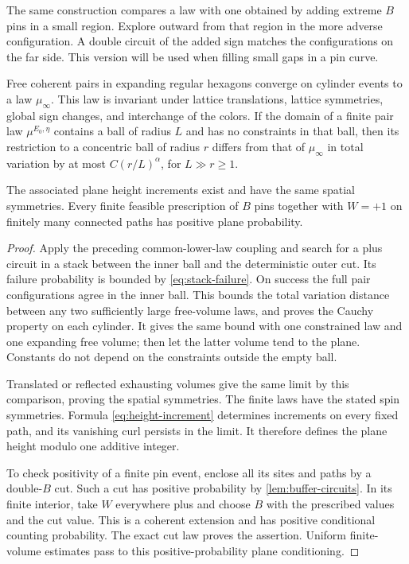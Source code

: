 The same construction compares a law with one obtained by adding extreme
$B$ pins in a small region.  Explore outward from that region in the more
adverse configuration.  A double circuit of the added sign matches the
configurations on the far side.  This version will be used when filling
small gaps in a pin curve.

\begin{proposition}
\label{prop:plane-mixing}
Free coherent pairs in expanding regular hexagons converge on cylinder
events to a law $\mu_\infty$.  This law is invariant under lattice
translations, lattice symmetries, global sign changes, and interchange
of the colors.  If the domain of a finite pair law $\mu^{E_0,\eta}$
contains a ball of radius $L$ and has no constraints in that ball, then
its restriction to a concentric
ball of radius $r$ differs from that of $\mu_\infty$ in total variation
by at most $C(r/L)^\alpha$, for $L\gg r\geq1$.

The associated plane height increments exist and have the same spatial
symmetries.  Every finite feasible prescription of $B$ pins together with
$W=+1$ on finitely many connected paths has positive plane probability.
\end{proposition}

\begin{proof}
Apply the preceding common-lower-law coupling and search for a plus circuit
in a stack between the inner ball and the deterministic outer cut.  Its
failure probability is bounded by \eqref{eq:stack-failure}.  On success
the full pair configurations agree in the inner ball.  This bounds the
total variation distance between any two sufficiently large free-volume
laws, and proves the Cauchy property on each cylinder.  It gives the same
bound with one constrained law and one expanding free volume; then let
the latter volume tend to the plane.  Constants do not depend on the
constraints outside the empty ball.

Translated or reflected exhausting volumes give the same limit by this
comparison, proving the spatial symmetries.  The finite laws have the
stated spin symmetries.  Formula \eqref{eq:height-increment} determines
increments on every fixed path, and its vanishing curl persists in the
limit.  It therefore defines the plane height modulo one additive
integer.

To check positivity of a finite pin event, enclose all its sites and paths
by a double-$B$ cut.  Such a cut has positive probability by
\cref{lem:buffer-circuits}.  In its finite interior, take $W$ everywhere
plus and choose $B$ with the prescribed values and the cut value.  This
is a coherent extension and has positive conditional counting probability.
The exact cut law proves the assertion.  Uniform finite-volume estimates
pass to this positive-probability plane conditioning.
\end{proof}

